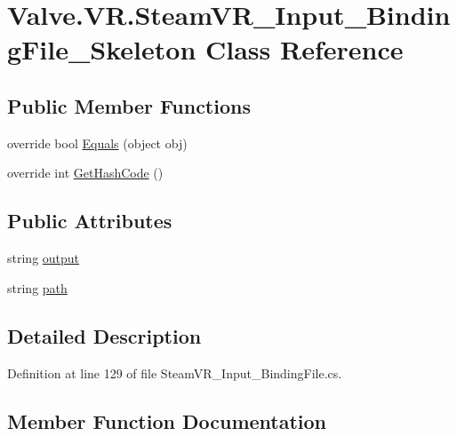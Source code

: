 \hypertarget{class_valve_1_1_v_r_1_1_steam_v_r___input___binding_file___skeleton}{}\section{Valve.\+V\+R.\+Steam\+V\+R\+\_\+\+Input\+\_\+\+Binding\+File\+\_\+\+Skeleton Class Reference}
\label{class_valve_1_1_v_r_1_1_steam_v_r___input___binding_file___skeleton}
\subsection*{Public Member Functions}
\begin{DoxyCompactItemize}
\item 
override bool \mbox{\hyperlink{class_valve_1_1_v_r_1_1_steam_v_r___input___binding_file___skeleton_a69b5c2c62817868a933a26cfb5610920}{Equals}} (object obj)
\item 
override int \mbox{\hyperlink{class_valve_1_1_v_r_1_1_steam_v_r___input___binding_file___skeleton_a9404224797b3630f022f7216ad36ac9a}{Get\+Hash\+Code}} ()
\end{DoxyCompactItemize}
\subsection*{Public Attributes}
\begin{DoxyCompactItemize}
\item 
string \mbox{\hyperlink{class_valve_1_1_v_r_1_1_steam_v_r___input___binding_file___skeleton_a600551cfee1bae4667e99a1a5b5fbf70}{output}}
\item 
string \mbox{\hyperlink{class_valve_1_1_v_r_1_1_steam_v_r___input___binding_file___skeleton_a564dea40eb0a4c32e37c065adf257502}{path}}
\end{DoxyCompactItemize}


\subsection{Detailed Description}


Definition at line 129 of file Steam\+V\+R\+\_\+\+Input\+\_\+\+Binding\+File.\+cs.



\subsection{Member Function Documentation}
\mbox{\label{class_valve_1_1_v_r_1_1_steam_v_r___input___binding_file___skeleton_a69b5c2c62817868a933a26cfb5610920}} 
